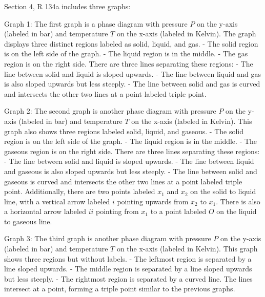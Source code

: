 Section 4, R 134a includes three graphs:

Graph 1:
The first graph is a phase diagram with pressure \( P \) on the y-axis (labeled in bar) and temperature \( T \) on the x-axis (labeled in Kelvin). The graph displays three distinct regions labeled as solid, liquid, and gas. 
- The solid region is on the left side of the graph.
- The liquid region is in the middle.
- The gas region is on the right side.
There are three lines separating these regions:
- The line between solid and liquid is sloped upwards.
- The line between liquid and gas is also sloped upwards but less steeply.
- The line between solid and gas is curved and intersects the other two lines at a point labeled triple point.

Graph 2:
The second graph is another phase diagram with pressure \( P \) on the y-axis (labeled in bar) and temperature \( T \) on the x-axis (labeled in Kelvin). This graph also shows three regions labeled solid, liquid, and gaseous.
- The solid region is on the left side of the graph.
- The liquid region is in the middle.
- The gaseous region is on the right side.
There are three lines separating these regions:
- The line between solid and liquid is sloped upwards.
- The line between liquid and gaseous is also sloped upwards but less steeply.
- The line between solid and gaseous is curved and intersects the other two lines at a point labeled triple point.
Additionally, there are two points labeled \( x_1 \) and \( x_2 \) on the solid to liquid line, with a vertical arrow labeled \( i \) pointing upwards from \( x_2 \) to \( x_1 \). There is also a horizontal arrow labeled \( ii \) pointing from \( x_1 \) to a point labeled \( O \) on the liquid to gaseous line.

Graph 3:
The third graph is another phase diagram with pressure \( P \) on the y-axis (labeled in bar) and temperature \( T \) on the x-axis (labeled in Kelvin). This graph shows three regions but without labels.
- The leftmost region is separated by a line sloped upwards.
- The middle region is separated by a line sloped upwards but less steeply.
- The rightmost region is separated by a curved line.
The lines intersect at a point, forming a triple point similar to the previous graphs.